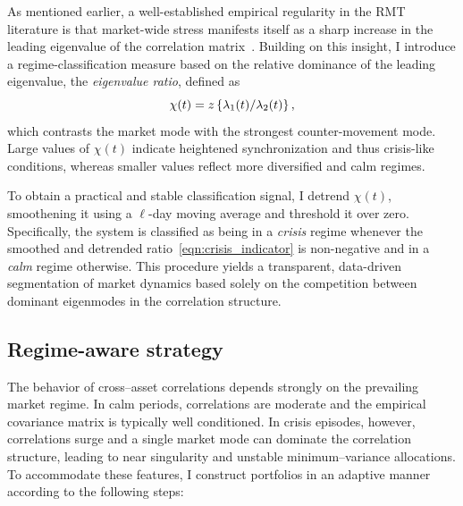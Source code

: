 \documentclass[pdflatex,sn-basic]{sn-jnl}%
\theoremstyle{thmstyleone}%
\theoremstyle{thmstyletwo}%
\theoremstyle{thmstylethree}%
\begin{document}
As mentioned earlier, a well-established empirical regularity in the RMT literature is that market-wide stress manifests itself as a sharp increase in the leading eigenvalue of the correlation matrix~\citep{laloux1999noise, plerou2002random}. Building on this insight, I introduce a regime-classification measure based on the relative dominance of the leading eigenvalue, the \textit{eigenvalue ratio}, defined as
\begin{equation}
\label{eqn:crisis_indicator}
    \chi(t) = z\left\{ \lambda_{1}(t) / \lambda_{2}(t) \right\},
\end{equation}
which contrasts the market mode with the strongest counter-movement mode. Large values of $\chi(t)$ indicate heightened synchronization and thus crisis-like conditions, whereas smaller values reflect more diversified and calm regimes. 

To obtain a practical and stable classification signal, I detrend $\chi(t)$, smoothening it using a $\ell$-day moving average and threshold it over zero. Specifically, the system is classified as being in a \textit{crisis} regime whenever the smoothed and detrended ratio~\eqref{eqn:crisis_indicator} is non-negative and in a \textit{calm} regime otherwise. This procedure yields a transparent, data-driven segmentation of market dynamics based solely on the competition between dominant eigenmodes in the correlation structure.

\subsection{Regime-aware strategy}
The behavior of cross--asset correlations depends strongly on the prevailing
market regime.  In calm periods, correlations are moderate and the empirical
covariance matrix is typically well conditioned.  In crisis episodes, however,
correlations surge and a single market mode can dominate the correlation
structure, leading to near singularity and unstable minimum--variance
allocations.  To accommodate these features, I construct portfolios in an
adaptive manner according to the following steps:
\end{document}
